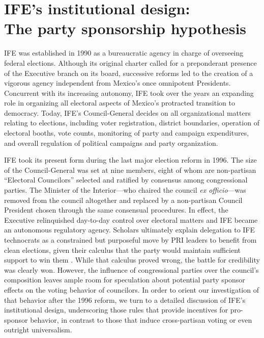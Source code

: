 \documentclass[12 pt]{article}
\renewcommand{\footnote}{\endnote}
\begin{document}
\section{IFE's institutional design:\\  The party sponsorship hypothesis}\label{S:description}
\doublespacing
IFE was established in 1990 as a bureaucratic agency in charge of overseeing federal elections.  Although its original charter called for a preponderant presence of the Executive branch on its board, successive reforms led to the creation of a vigorous agency independent from Mexico's once omnipotent Presidents.  Concurrent with its increasing autonomy, IFE took over the years an expanding role in organizing all electoral aspects of Mexico's protracted transition to democracy.  Today, IFE's Council-General decides on all organizational matters relating to elections, including voter registration, district boundaries, operation of electoral booths, vote counts, monitoring of party and campaign expenditures, and overall regulation of political campaigns and party organization.

IFE took its present form during the last major election reform in 1996.  The size of the Council-General was set at nine members, eight of whom are non-partisan ``Electoral Councilors'' selected and ratified by consensus among congressional parties.  The Minister of the Interior---who chaired the council \emph{ex officio}---was removed from the council altogether and replaced by a non-partisan Council President chosen through the same consensual procedures.  In effect, the Executive relinquished day-to-day control over electoral matters and IFE became an autonomous regulatory agency.%
Scholars ultimately explain delegation to IFE technocrats as a constrained but purposeful move by PRI leaders to benefit from clean elections, given their calculus that the party would maintain sufficient support to win them \citep{MagaloniND}.  While that calculus proved wrong, the battle for credibility was clearly won. However, the influence of congressional parties over the council's composition leaves ample room for speculation about potential party sponsor effects on the voting behavior of councilors.  In order to orient our investigation of that behavior after the 1996 reform, we turn to a detailed discussion of IFE's institutional design, underscoring those rules that provide incentives for pro-sponsor behavior, in contrast to those that induce cross-partisan voting or even outright universalism.
\end{document}
